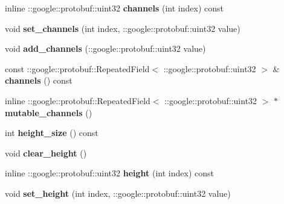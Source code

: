 \begin{DoxyCompactItemize}
\mbox{\label{classcaffe_1_1_dummy_data_parameter_a8b2880c1faee09c97415926bcc06aec6}} 
inline \+::google\+::protobuf\+::uint32 {\bfseries channels} (int index) const
\item 
\mbox{\label{classcaffe_1_1_dummy_data_parameter_a1cf599f4596c1f05355f36b27b1bcf80}} 
void {\bfseries set\+\_\+channels} (int index, \+::google\+::protobuf\+::uint32 value)
\item 
\mbox{\label{classcaffe_1_1_dummy_data_parameter_a167d98c909ab50b933b9646e2eb91a78}} 
void {\bfseries add\+\_\+channels} (\+::google\+::protobuf\+::uint32 value)
\item 
\mbox{\label{classcaffe_1_1_dummy_data_parameter_a0432cb104b83b6b61d72a01631d912ba}} 
const \+::google\+::protobuf\+::\+Repeated\+Field$<$ \+::google\+::protobuf\+::uint32 $>$ \& {\bfseries channels} () const
\item 
\mbox{\label{classcaffe_1_1_dummy_data_parameter_af1accbcefd2164cc0f7db79afafe7484}} 
inline \+::google\+::protobuf\+::\+Repeated\+Field$<$ \+::google\+::protobuf\+::uint32 $>$ $\ast$ {\bfseries mutable\+\_\+channels} ()
\item 
\mbox{\label{classcaffe_1_1_dummy_data_parameter_a932350f8631e24715f36b3f81dee2bd4}} 
int {\bfseries height\+\_\+size} () const
\item 
\mbox{\label{classcaffe_1_1_dummy_data_parameter_a08a98d7357cd2ad5a3327ea921ec6be9}} 
void {\bfseries clear\+\_\+height} ()
\item 
\mbox{\label{classcaffe_1_1_dummy_data_parameter_a853903ebe0652e9da72f2b8bdf9bbc65}} 
inline \+::google\+::protobuf\+::uint32 {\bfseries height} (int index) const
\item 
\mbox{\label{classcaffe_1_1_dummy_data_parameter_a569f66c6a8309ef0126ceebddc9f8f9f}} 
void {\bfseries set\+\_\+height} (int index, \+::google\+::protobuf\+::uint32 value)

\end{DoxyCompactItemize}
